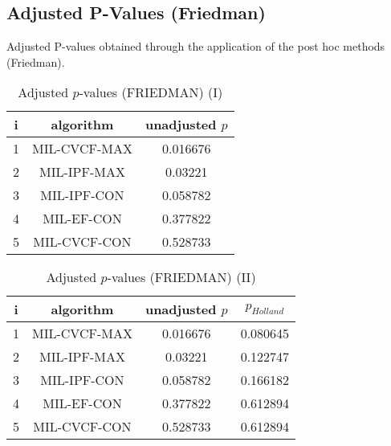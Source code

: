 \documentclass[a4paper,10pt]{article}
\begin{document}
\begin{landscape}
\newpage

\section{Adjusted P-Values (Friedman)}


Adjusted P-values obtained through the application of the post hoc methods (Friedman).

\begin{table}[!htp]
\centering\small
\begin{tabular}{ccc}
i&algorithm&unadjusted $p$\\
\hline1&MIL-CVCF-MAX&0.016676\\2&MIL-IPF-MAX&0.03221\\3&MIL-IPF-CON&0.058782\\4&MIL-EF-CON&0.377822\\5&MIL-CVCF-CON&0.528733\\\hline
\end{tabular}
\caption{Adjusted $p$-values (FRIEDMAN) (I)}
\end{table}
\begin{table}[!htp]
\centering\small
\begin{tabular}{cccc}
i&algorithm&unadjusted $p$&$p_{Holland}$\\
\hline1&MIL-CVCF-MAX&0.016676&0.080645\\2&MIL-IPF-MAX&0.03221&0.122747\\3&MIL-IPF-CON&0.058782&0.166182\\4&MIL-EF-CON&0.377822&0.612894\\5&MIL-CVCF-CON&0.528733&0.612894\\\hline
\end{tabular}
\caption{Adjusted $p$-values (FRIEDMAN) (II)}
\end{table}

\newpage
\end{landscape}
\end{document}
